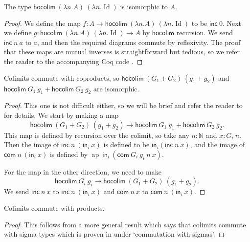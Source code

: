 \documentclass[a4paper,UKenglish]{lipics-v2016}
\newcommand{\Boperator}[1]{\mathsf{#1}}
\newcommand{\inn}{\Boperator{in}}
\newcommand{\ap}[0]{\operatorname{ap}}
\newcommand{\hocolim}[0]{\Boperator{hocolim}}
\newcommand{\inc}[0]{\Boperator{inc}}
\newcommand{\com}[0]{\Boperator{com}}
\begin{document}
\begin{lemma}
\label{lem:colimcon}
The type $\hocolim \> (\lambda n . A) \> (\lambda n . \operatorname{Id})$ is isomorphic to $A$.
\end{lemma}

\begin{proof}
We define the map $f : A \rightarrow \hocolim \> (\lambda n . A) \> (\lambda n . \operatorname{Id})$
to be $\inc \> 0$.
Next we define $g : \hocolim \> (\lambda n . A) \> (\lambda n . \operatorname{Id}) \rightarrow A$ by $\hocolim$ recursion.
We send $\inc \> n \> a$ to $a$, and then the required diagrams commute by reflexivity.
The proof that these maps are mutual inverses is straightforward but tedious, so we refer the reader to the accompanying Coq code \cite{CoqImpl}.
\end{proof}

\begin{lemma}
\label{lem:colimsum}
Colimits commute with coproducts, so $\hocolim \> (G_1 + G_2) \> (g_1 + g_2)$ and $\hocolim \> G_1 \> g_1 + \hocolim \> G_2 \> g_2$ are isomorphic.
\end{lemma}

\begin{proof}
This one is not difficult either, so we will be brief and refer the reader to \cite{CoqImpl} for details.
We start by making a map 
\[
\hocolim \> (G_1+G_2) \> (g_1 + g_2) \rightarrow \hocolim \> G_1 \> g_1 + \hocolim \> G_2 \> g_2.
\]
This map is defined by recursion over the colimit, so take any $n : \mathbb{N}$ and $x : G_i \> n$.
Then the image of $\inc \> n \> (\inn_i \> x)$ is defined to be $\inn_i (\inc \> n \> x)$, and the image of $\com \> n \> (\inn_i \> x)$ is defined by
$\ap \> \inn_i \> (\com \> G_i \> g_i \> n \> x)$.

For the map in the other direction, we need to make 
\[
\hocolim \> G_i \> g_i \rightarrow \hocolim \> (G_1 + G_2) \> (g_1 + g_2).
\]
We send $\inc \> n \> x$ to $\inc \> n \> (\inn_i \> x)$ and $\com \> n \> x$ to $\com \> n \> (\inn_i \> x)$.
\end{proof}

\begin{lemma}
\label{lem:colimprod}
Colimits commute with products.
\end{lemma}

\begin{proof}
This follows from a more general result which says that colimits commute with sigma types which is proven in \cite{boulier2015colimites,boulier2016} under `commutation with sigmas'.
\end{proof}
\end{document}
